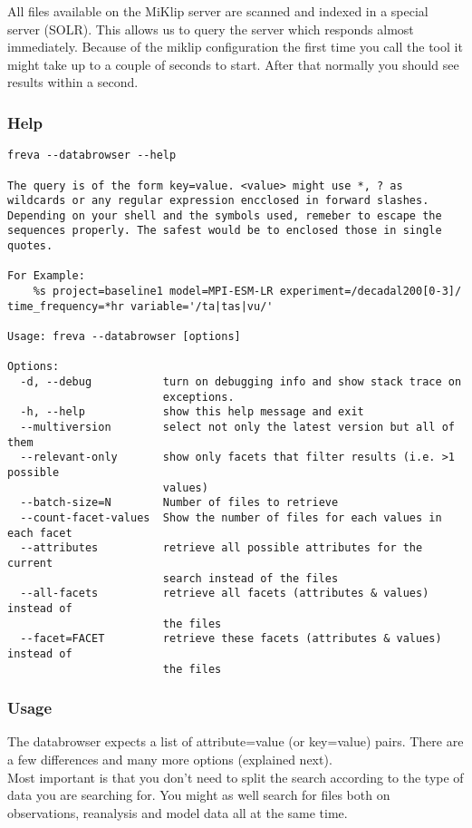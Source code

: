 \documentclass[a4paper,11pt]{ltxdoc}
\begin{document}
All files available on the MiKlip server are scanned and indexed in a special server (SOLR). This allows us to query the server which responds almost immediately. Because of the miklip configuration the first time you call the tool it might take up to a couple of seconds to start. After that normally you should see results within a second.

\subsubsection{Help}
\begin{lstlisting}
freva --databrowser --help

The query is of the form key=value. <value> might use *, ? as wildcards or any regular expression encclosed in forward slashes. Depending on your shell and the symbols used, remeber to escape the sequences properly. The safest would be to enclosed those in single quotes.

For Example:
    %s project=baseline1 model=MPI-ESM-LR experiment=/decadal200[0-3]/ 
time_frequency=*hr variable='/ta|tas|vu/'

Usage: freva --databrowser [options]

Options:
  -d, --debug           turn on debugging info and show stack trace on
                        exceptions.
  -h, --help            show this help message and exit
  --multiversion        select not only the latest version but all of them
  --relevant-only       show only facets that filter results (i.e. >1 possible
                        values)
  --batch-size=N        Number of files to retrieve
  --count-facet-values  Show the number of files for each values in each facet
  --attributes          retrieve all possible attributes for the current
                        search instead of the files
  --all-facets          retrieve all facets (attributes & values) instead of
                        the files
  --facet=FACET         retrieve these facets (attributes & values) instead of
                        the files
\end{lstlisting}

\subsubsection{Usage}

The databrowser expects a list of attribute=value (or key=value) pairs. There are a few differences and many more options (explained next).\\
Most important is that you don't need to split the search according to the type of data you are searching for. You might as well search for files both on observations, reanalysis and model data all at the same time.\\
\end{document}
